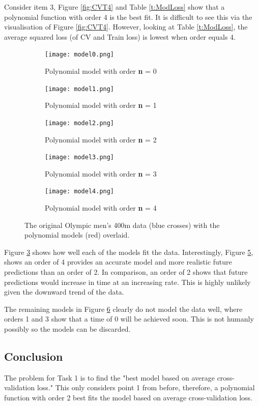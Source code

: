 {Consider item 3, Figure \ref{fig:CVT4} and Table \ref{t:ModLoss} show that a polynomial function with order 4 is the best fit. It is difficult to see this via the visualisation of Figure \ref{fig:CVT4}. However, looking at Table \ref{t:ModLoss}, the average squared loss (of CV and Train loss) is lowest when order equals 4. 

\begin{figure}[h!] 
	\centering
	\begin{subfigure}[b]{0.4\textwidth}
		\texttt{[image: model0.png]}
		\caption{Polynomial model with order \textbf{n} = 0}
		\label{fig:model0}
	\end{subfigure}
	\begin{subfigure}[b]{0.4\textwidth}
		\texttt{[image: model1.png]}
		\caption{Polynomial model with order \textbf{n} = 1}
		\label{fig:model1}
	\end{subfigure}
	\begin{subfigure}[b]{0.4\textwidth}
		\texttt{[image: model2.png]}
		\caption{Polynomial model with order \textbf{n} = 2}
		\label{fig:model2}
	\end{subfigure}
	\begin{subfigure}[b]{0.4\textwidth}
		\texttt{[image: model3.png]}
		\caption{Polynomial model with order \textbf{n} = 3}
		\label{fig:model3}
	\end{subfigure}
	\begin{subfigure}[b]{0.4\textwidth}
		\texttt{[image: model4.png]}
		\caption{Polynomial model with order \textbf{n} = 4}
		\label{fig:model4}
	\end{subfigure}
	\caption{The original Olympic men's 400m data (blue crosses) with the polynomial models (red) overlaid.}
	\label{men400-1}
\end{figure}

Figure \ref{fig:model2} shows how well each of the models fit the data. Interestingly, Figure \ref{fig:model4}, shows an order of 4 provides an accurate model and more realistic future predictions than an order of 2. In comparison, an order of 2 shows that future predictions would increase in time at an increasing rate. This is highly unlikely given the downward trend of the data.

The remaining models in Figure \ref{men400-1} clearly do not model the data well, where orders 1 and 3 show that a time of 0 will be achieved soon. This is not humanly possibly so the models can be discarded. 

\subsection{Conclusion}
The problem for Task 1 is to find the "best model based on average cross-validation loss." This only considers point 1 from before, therefore, a polynomial function with order 2 best fits the model based on average cross-validation loss.

}

